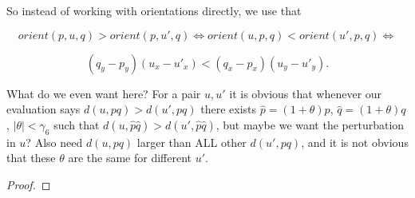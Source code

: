 So instead of working with orientations directly, we use that

$$orient(p, u, q) > orient(p, u', q) \iff orient(u, p, q) < orient(u', p, q) 
\iff$$

$$(q_y - p_y) (u_x - u'_x) < (q_x - p_x) (u_y - u'_y).$$

\begin{lemma}
    What do we even want here? For a pair $u, u'$ it is obvious that whenever
    our evaluation says $d(u, pq) > d(u', pq)$ there exists 
    $\hat{p} = (1 + \theta)p$, $\hat{q} = (1 + \theta)q$, $|\theta| < \gamma_6$
    such that $d(u, \hat{p}\hat{q}) > d(u', \hat{p}\hat{q})$, but maybe we want
    the perturbation in $u$? Also need $d(u, pq)$ larger than ALL other $d(u', pq)$,
    and it is not obvious that these $\theta$ are the same for different $u'$.
\end{lemma}

\begin{proof}
\end{proof}
